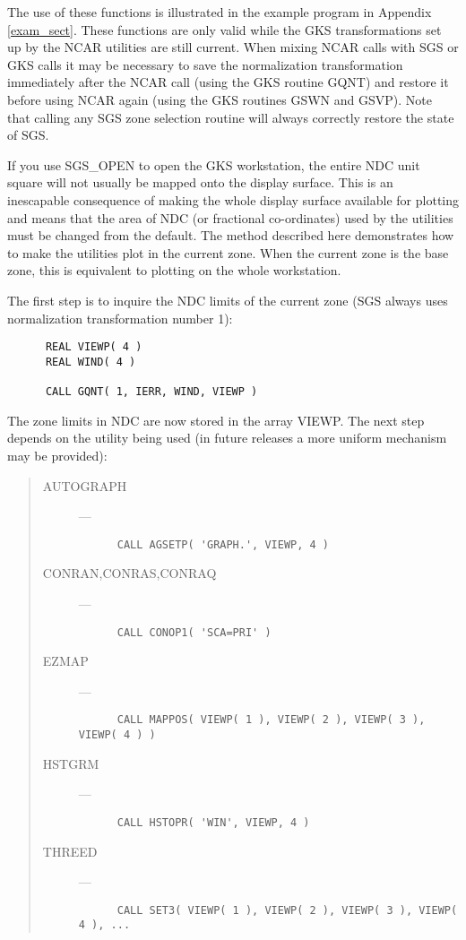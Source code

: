 The use of these functions is illustrated in the example program in Appendix 
\ref{exam_sect}.
These functions are only valid while the GKS transformations set up by the NCAR
utilities are still current.
When mixing NCAR calls with SGS or GKS calls it may be necessary to save the
normalization transformation immediately after the NCAR call (using the GKS
routine GQNT) and restore it before using NCAR again (using the GKS routines 
GSWN and GSVP).
Note that calling any SGS zone selection routine will always correctly restore
the state of SGS.

If you use SGS\_OPEN to open the GKS workstation, the entire NDC unit square
will not usually be mapped onto the display surface. 
This is an inescapable consequence of making the whole display surface
available for plotting and means that the area of NDC (or fractional
co-ordinates) used by the utilities must be changed from the default.
The method described here demonstrates how to make the utilities plot in the
current zone. 
When the current zone is the base zone, this is equivalent to plotting on the
whole workstation.

The first step is to inquire the NDC limits of the current zone (SGS always
uses normalization transformation number 1):

\begin{verbatim}
      REAL VIEWP( 4 )
      REAL WIND( 4 )

      CALL GQNT( 1, IERR, WIND, VIEWP )
\end{verbatim}

The zone limits in NDC are now stored in the array VIEWP. 
The next step depends on the utility being used (in future releases a more
uniform mechanism may be provided):

\begin{quote}
\begin{description}
\item [AUTOGRAPH] ---
\begin{verbatim}
      CALL AGSETP( 'GRAPH.', VIEWP, 4 )
\end{verbatim}

\item [CONRAN,CONRAS,CONRAQ] ---
\begin{verbatim}
      CALL CONOP1( 'SCA=PRI' )
\end{verbatim}

\item [EZMAP] ---
\begin{verbatim}
      CALL MAPPOS( VIEWP( 1 ), VIEWP( 2 ), VIEWP( 3 ), VIEWP( 4 ) )
\end{verbatim}

\item [HSTGRM] ---
\begin{verbatim}
      CALL HSTOPR( 'WIN', VIEWP, 4 )
\end{verbatim}

\item [THREED] ---
\begin{verbatim}
      CALL SET3( VIEWP( 1 ), VIEWP( 2 ), VIEWP( 3 ), VIEWP( 4 ), ...
\end{verbatim}
\end{description}
\end{quote}

